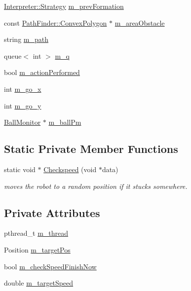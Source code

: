 \begin{DoxyCompactItemize}
\item 
\hyperlink{classInterpreter_a0fb49436c8c14ca79e13f1cd78119088}{Interpreter::Strategy} \hyperlink{classTeamRobot_ab32d14c3de4fd5a6ff6db39eb04f52f2}{m\_\-prevFormation}
\item 
const \hyperlink{structPathFinder_1_1ConvexPolygon}{PathFinder::ConvexPolygon} $\ast$ \hyperlink{classTeamRobot_af06d7a399ac2a3c24c27a7af1c6e38e5}{m\_\-areaObstacle}
\item 
string \hyperlink{classTeamRobot_af170b8d2e1b76b12f8cc83f6ec908e40}{m\_\-path}
\item 
queue$<$ int $>$ \hyperlink{classTeamRobot_a982ed6b6964c5e8b94519ef91b52c468}{m\_\-q}
\item 
bool \hyperlink{classTeamRobot_ab98a148247f0c8bbadac3cfc8fa268c8}{m\_\-actionPerformed}
\item 
int \hyperlink{classTeamRobot_ae4bafa3b5f0df155b1a45f95f6671316}{m\_\-go\_\-x}
\item 
int \hyperlink{classTeamRobot_ad0b6cee88278087238bf6fcecb419808}{m\_\-go\_\-y}
\item 
\hyperlink{classBallMonitor}{BallMonitor} $\ast$ \hyperlink{classTeamRobot_a84b5181a2fadaf7653d32f04fa04d657}{m\_\-ballPm}
\end{DoxyCompactItemize}
\subsection*{Static Private Member Functions}
\begin{DoxyCompactItemize}
\item 
static void $\ast$ \hyperlink{classTeamRobot_ac52f7f240fde40db09116e8639a53c21}{Checkspeed} (void $\ast$data)
\begin{DoxyCompactList}\small\item\em moves the robot to a random position if it stucks somewhere. \item\end{DoxyCompactList}\end{DoxyCompactItemize}
\subsection*{Private Attributes}
\begin{DoxyCompactItemize}
\item 
pthread\_\-t \hyperlink{classTeamRobot_a3e9052964ba03b6dce4a34d1e45dbb1f}{m\_\-thread}
\item 
Position \hyperlink{classTeamRobot_ab7446260b71870667a83b8c53e1274be}{m\_\-targetPos}
\item 
bool \hyperlink{classTeamRobot_ac4229cdeb227ab578cfe38023af2db59}{m\_\-checkSpeedFinishNow}
\item 
double \hyperlink{classTeamRobot_aaea621727542377ed5d5e1a316c5293c}{m\_\-targetSpeed}
\end{DoxyCompactItemize}


